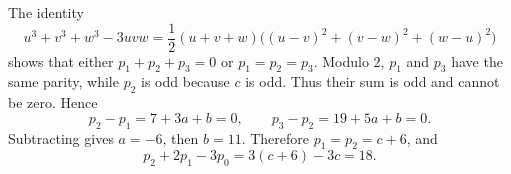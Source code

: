 The identity
\[
u^3+v^3+w^3-3uvw
=\dfrac{1}{2}(u+v+w)\bigl((u-v)^2+(v-w)^2+(w-u)^2\bigr)
\]
shows that either $p_1+p_2+p_3=0$ or $p_1=p_2=p_3$.
Modulo $2$, $p_1$ and $p_3$ have the same parity, while $p_2$ is odd because $c$ is odd. Thus their sum is odd and cannot be zero. Hence
\[
p_2-p_1=7+3a+b=0,\qquad
p_3-p_2=19+5a+b=0.
\]
Subtracting gives $a=-6$, then $b=11$. Therefore $p_1=p_2=c+6$, and
\[
p_2+2p_1-3p_0=3(c+6)-3c=\boxed{18}.
\]
